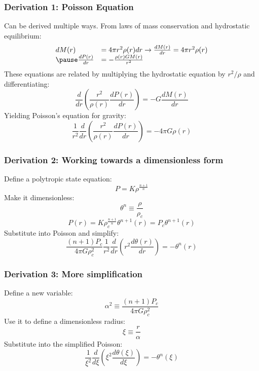 \documentclass[handout]{beamer}
\begin{document}
        \begin{frame}
            \frametitle{Derivation 1: Poisson Equation}
            Can be derived multiple ways. From laws of mass conservation and
            hydrostatic equilibrium:
            \pause
            \[ \begin{array}{l l}
                dM(r) &= 4\pi r^2\rho(r)dr \rightarrow \frac{dM(r)}{dr}=4\pi r^2\rho(r) \\
                \pause
                \frac{dP(r)}{dr} &= -\frac{\rho(r)GM(r)}{r^2}
                \end{array}
            \]
            \pause
            These equations are related by multiplying the hydrostatic equation by
            \(r^2/\rho\) and differentiating:
            \pause
            \[\frac{d}{dr}\left(\frac{r^2}{\rho(r)}\frac{dP(r)}{dr}\right)=-G\frac{dM(r)}{dr}\]
            \pause
            Yielding Poisson's equation for gravity:
            \pause
            \[ \frac{1}{r^2} \frac{d}{dr} \left( \frac{r^2}{\rho(r)} \frac{dP(r)}{dr} \right) =-4 \pi G \rho(r) \]
        \end{frame}
        \begin{frame}
            \frametitle{Derivation 2: Working towards a dimensionless form}

            Define a polytropic state equation:
            \pause
            \[ P=K\rho^{\frac{n+1}{n}} \]
            \pause
            Make it dimensionless:
            \[\theta^n\equiv\frac{\rho}{\rho_c} \]
            \pause
            \[ P(r)=K\rho_c^{\frac{n+1}{n}}\theta^{n+1}(r)=P_c\theta^{n+1}(r) \]
            \pause
            Substitute into Poisson and simplify:
            \pause
            \[\frac{(n+1)P_c}{4\pi G\rho_c^2}\frac{1}{r^2}\frac{d}{dr}\left(r^2\frac{d\theta(r)}{dr}\right)=-\theta^n(r) \]

        \end{frame}

        \begin{frame}
            \frametitle{Derivation 3: More simplification}

            Define a new variable:
            \pause
            \[\alpha^2 \equiv \frac{(n+1)P_c}{4\pi G\rho_c^2}\]
            \pause
            Use it to define a dimensionless radius:
            \pause
            \[\xi \equiv \frac{r}{\alpha}\]
            \pause
            Substitute into the simplified Poisson:
            \pause
            \[\frac{1}{\xi^2}\frac{d}{d\xi}\left(\xi^2\frac{d\theta(\xi)}{d\xi}\right)=-\theta^n(\xi)\]

        \end{frame}
\end{document}
